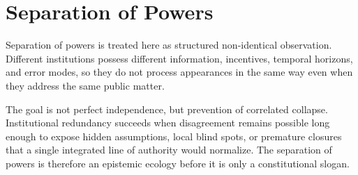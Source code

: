 
\chapter{Separation of Powers}
\label{ch:ch053}

Separation of powers is treated here as structured non-identical observation. Different institutions possess different information, incentives, temporal horizons, and error modes, so they do not process appearances in the same way even when they address the same public matter.

The goal is not perfect independence, but prevention of correlated collapse. Institutional redundancy succeeds when disagreement remains possible long enough to expose hidden assumptions, local blind spots, or premature closures that a single integrated line of authority would normalize. The separation of powers is therefore an epistemic ecology before it is only a constitutional slogan.
